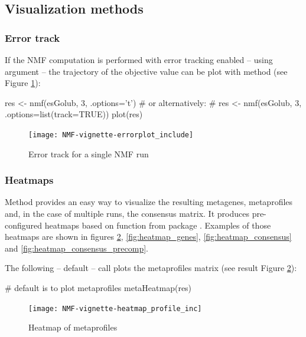 \documentclass[a4paper]{article}
\begin{document}
\subsection{Visualization methods}

\subsubsection*{Error track}

If the NMF computation is performed with error tracking enabled -- using argument 
 -- the trajectory of the objective value can be plot with 
method  (see Figure \ref{fig:error}): 

\begin{Schunk}
\begin{Sinput}
 res <- nmf(esGolub, 3, .options='t')
 # or alternatively:
 # res <- nmf(esGolub, 3, .options=list(track=TRUE))
 plot(res)
\end{Sinput}
\end{Schunk}

\begin{figure}[ht]
\centering
\texttt{[image: NMF-vignette-errorplot\_include]}
\caption{Error track for a single NMF run}
\label{fig:error}
\end{figure}

\subsubsection*{Heatmaps}

Method  provides an easy way to visualize the resulting 
metagenes, metaprofiles and, in the case of multiple runs, the consensus matrix. 
It produces pre-configured heatmaps based on function  from 
package . Examples of those heatmaps are shown in figures \ref{fig:heatmap_profiles}, 
\ref{fig:heatmap_genes}, \ref{fig:heatmap_consensus} and
\ref{fig:heatmap_consensus_precomp}.

The following -- default -- call plots the metaprofiles matrix (see result 
Figure \ref{fig:heatmap_profiles}):
\begin{Schunk}
\begin{Sinput}
 # default is to plot metaprofiles
 metaHeatmap(res) 
\end{Sinput}
\end{Schunk}

\begin{figure}[ht]
\centering
\texttt{[image: NMF-vignette-heatmap\_profile\_inc]}
\caption{Heatmap of metaprofiles}
\label{fig:heatmap_profiles}
\end{figure}
\end{document}
